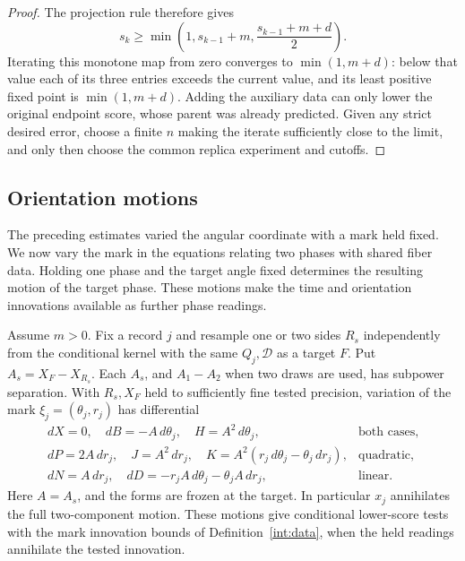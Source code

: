 \begin{proof}
The projection rule therefore gives
\[
 s_k\geq\min\left(1,s_{k-1}+m,
                         \frac{s_{k-1}+m+d}{2}\right).
\]
Iterating this monotone map from zero converges to
$\min(1,m+d)$: below that value each of its three
entries exceeds the current value, and its least
positive fixed point is $\min(1,m+d)$. Adding the
auxiliary data can only lower the original endpoint
score, whose parent was already predicted. Given any
strict desired error, choose a finite $n$ making the
iterate sufficiently close to the limit, and only
then choose the common replica experiment and cutoffs.
\end{proof}

\subsection{Orientation motions}

The preceding estimates varied the angular coordinate with a mark held
fixed. We now vary the mark in the equations relating two phases with
shared fiber data. Holding one phase and the target angle fixed determines
the resulting motion of the target phase. These motions make the time and
orientation innovations available as further phase readings.

\begin{lemma}\label{int:mark-motion}
Assume $m>0$. Fix a record $j$ and resample one or two
sides $R_s$ independently from the conditional kernel
with the same $Q_j,\mathcal D$ as a target $F$. Put
$A_s=X_F-X_{R_s}$. Each $A_s$, and $A_1-A_2$ when two
draws are used, has subpower separation. With $R_s,X_F$
held to sufficiently fine tested precision, variation
of the mark $\xi_j=(\theta_j,r_j)$ has differential
\begin{equation}
\begin{array}{ll}
 dX=0,\quad dB=-A\,d\theta_j,\quad H=A^2\,d\theta_j,
      &\text{both cases},\\
 dP=2A\,dr_j,\quad J=A^2\,dr_j,\quad
 K=A^2(r_j\,d\theta_j-\theta_j\,dr_j),
      &\text{quadratic},\\
 dN=A\,dr_j,\quad
 dD=-r_jA\,d\theta_j-\theta_jA\,dr_j,
      &\text{linear}.
\end{array}
\tag{trans}\label{eq:trans}
\end{equation}
Here $A=A_s$, and the forms are frozen at the target.
In particular $x_j$ annihilates the full two-component
motion. These motions give conditional lower-score
tests with the mark innovation bounds of
Definition~\ref{int:data}, when the held readings
annihilate the tested innovation.
\end{lemma}

